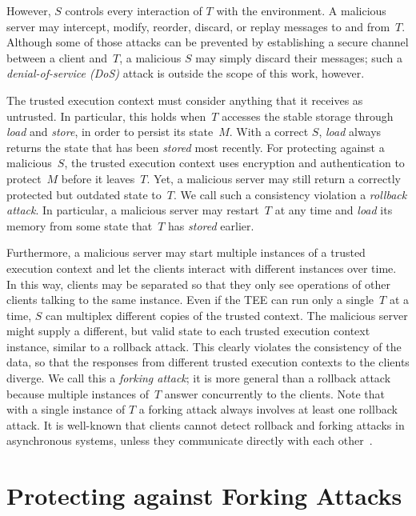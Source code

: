 \documentclass[11pt]{article}
\theoremstyle{plain-boldhead}
\theoremstyle{definition-boldhead}
\newcommand{\op}[1]{\textsl{#1}}
\begin{document}
However, $S$ controls every interaction of $T$ with the environment.  A
malicious server may intercept, modify, reorder, discard, or replay
messages to and from~$T$.  Although some of those attacks can be prevented
by establishing a secure channel between a client and~$T$, a malicious $S$
may simply discard their messages; such a \emph{denial-of-service (DoS)}
attack is outside the scope of this work, however.

The trusted execution context must consider anything that it receives as
untrusted.  In particular, this holds when~$T$ accesses the stable storage
through \op{load} and \op{store}, in order to persist its state~$M$.  With
a correct $S$, \op{load} always returns the state that has been
\op{stored} most recently.  For protecting against a malicious~$S$, the
trusted execution context uses encryption and authentication to protect~$M$
before it leaves~$T$.
%
Yet, a malicious server may still return a correctly protected but outdated
state to~$T$.  We call such a consistency violation a \emph{rollback
  attack}.  In particular, a malicious server may restart~$T$ at any time
and \op{load} its memory from some state that~$T$ has \op{stored} earlier.

Furthermore, a malicious server may start multiple instances of a trusted
execution context and let the clients interact with different instances over
time. In this way, clients may be separated so that they only see
operations of other clients talking to the same instance.  
Even if the TEE can run only a single~$T$ at a time, $S$ can multiplex 
different copies of the trusted context. 
The malicious server might supply a different, but valid state to each
trusted execution context instance, similar to a rollback attack.  This
clearly violates the consistency of the data, so that the responses from
different trusted execution contexts to the clients diverge.  We call this
a \emph{forking attack}; it is more general than a rollback attack because
multiple instances of~$T$ answer concurrently to the clients.
% 
Note that with a single instance of $T$ a forking attack always involves at
least one rollback attack.
% 
It is well-known that clients cannot detect rollback and
forking attacks in asynchronous systems, unless they communicate directly
with each other~\cite{mazsha02}.


\section{Protecting against Forking Attacks}
\label{sec:forking}
\end{document}
